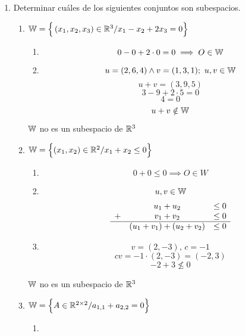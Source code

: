 \documentclass[../practica.root.tex]{subfiles}
\begin{document}
\begin{enumerate}
    \item Determinar cuáles de los siguientes conjuntos son subespacios.
          \begin{enumerate}
              \item $ \mathbb{W} = \Big\{ \left(x_1, x_2, x_3\right) \in \mathbb{R}^3 / x_1 - x_2 + 2x_3 = 0 \Big\} $
                    \begin{enumerate}
                        \item \[ 0 - 0 + 2 \cdot 0 = 0 \implies O \in \mathbb{W} \]
                        \item \[ u = (2,6,4) \land v = (1,3,1);\ u, v \in \mathbb{W} \]
                              \[ u + v = (3,9,5) \]
                              \[ 3 - 9 + 2 \cdot 5 = 0 \]
                              \[ 4 = 0 \]
                              \[ u+v \notin \mathbb{W} \]
                    \end{enumerate}
                    $\mathbb{W}$ no es un subespacio de $\mathbb{R}^3$
              \item $ \mathbb{W} = \Big\{ (x_1, x_2) \in \mathbb{R}^2 / x_1 + x_2 \le 0 \Big\} $
                    \begin{enumerate}
                        \item \[ 0 + 0 \le 0 \implies O \in W \]
                        \item \[ u, v \in \mathbb{W} \]
                              \[
                                  \begin{array}{lcc}
                                        & u_1 + u_2                 & \le 0 \\
                                      + & v_1 + v_2                 & \le 0 \\
                                      \hline
                                        & (u_1 + v_1) + (u_2 + v_2) & \le 0
                                  \end{array}
                              \]
                        \item \[ v = (2, -3) \text{, } c = -1 \]
                              \[ cv = -1\cdot(2, -3) = (-2, 3) \]
                              \[ -2 + 3 \nleq 0 \]
                    \end{enumerate}
                    $\mathbb{W}$ no es un subespacio de $\mathbb{R}^3$
              \item $ \mathbb{W} = \Big\{ A \in \mathbb{R}^{2\times2} / a_{1,1} + a_{2,2} = 0 \Big\} $
                    \begin{enumerate}
                        \item \[
\]
\end{enumerate}
\end{enumerate}
\end{enumerate}
\end{document}
